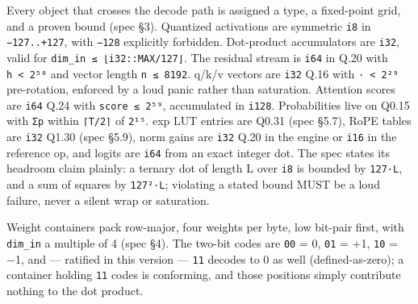 \documentclass[11pt]{article}
\begin{document}
Every object that crosses the decode path is assigned a type, a fixed-point grid, and a proven
bound (spec §3). Quantized activations are symmetric \texttt{i8} in \texttt{−127..+127}, with \texttt{−128} explicitly
forbidden. Dot-product accumulators are \texttt{i32}, valid for \texttt{dim\_in\ ≤\ ⌊i32::MAX/127⌋}. The residual
stream is \texttt{i64} in Q.20 with \texttt{\textbar{}h\textbar{}\ \textless{}\ 2⁵⁰} and vector length \texttt{n\ ≤\ 8192}. q/k/v vectors are \texttt{i32}
Q.16 with \texttt{\textbar{}·\textbar{}\ \textless{}\ 2²⁹} pre-rotation, enforced by a loud panic rather than saturation. Attention
scores are \texttt{i64} Q.24 with \texttt{\textbar{}score\textbar{}\ ≤\ 2⁵⁹}, accumulated in \texttt{i128}. Probabilities live on Q0.15
with \texttt{Σp} within \texttt{⌈T/2⌉} of \texttt{2¹⁵}. exp LUT entries are Q0.31 (spec §5.7), RoPE tables are \texttt{i32} Q1.30
(spec §5.9), norm gains are \texttt{i32} Q.20 in the engine or \texttt{i16} in the reference op, and logits are \texttt{i64}
from an exact integer dot. The spec states its headroom claim plainly: a ternary dot of length L
over \texttt{i8} is bounded by \texttt{127·L}, and a sum of squares by \texttt{127²·L}; violating a stated bound MUST
be a loud failure, never a silent wrap or saturation.

Weight containers pack row-major, four weights per byte, low bit-pair first, with \texttt{dim\_in} a
multiple of 4 (spec §4). The two-bit codes are \texttt{00} = 0, \texttt{01} = +1, \texttt{10} = −1, and --- ratified in this
version --- \texttt{11} decodes to 0 as well (defined-as-zero); a container holding \texttt{11} codes is
conforming, and those positions simply contribute nothing to the dot product.
\end{document}
